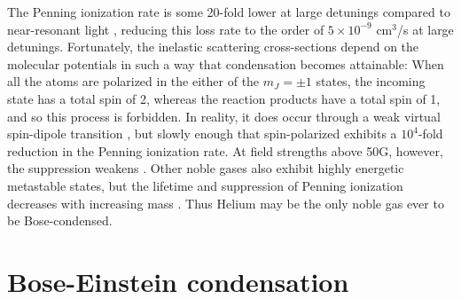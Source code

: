 	The Penning ionization rate is some 20-fold lower at large detunings compared to near-resonant light \cite{Mastwijk98}, reducing this loss rate to the order of $5\times10^{-9}$ cm$^3$/s at large detunings.
	Fortunately, the inelastic scattering cross-sections depend on the molecular potentials in such a way that condensation becomes attainable: When all the atoms are polarized in the either of the $m_J=\pm1$ states, the incoming state has a total spin of 2, whereas the reaction products have a total spin of 1, and so this process is forbidden.
	In reality, it does occur through a weak virtual spin-dipole transition \cite{Shlyapnikov94}, but slowly enough that spin-polarized \mhe exhibits a $10^4$-fold reduction in the Penning ionization rate.
	At field strengths above 50G, however, the suppression weakens \cite{Shlyapnikov94,Borbely12}.
	Other noble gases also exhibit highly energetic metastable states, but the lifetime and suppression of Penning ionization decreases with increasing mass \cite{Orzel99, Spoden05}.
	Thus Helium may be the only noble gas ever to be Bose-condensed.
	

	
	
\section{Bose-Einstein condensation}

